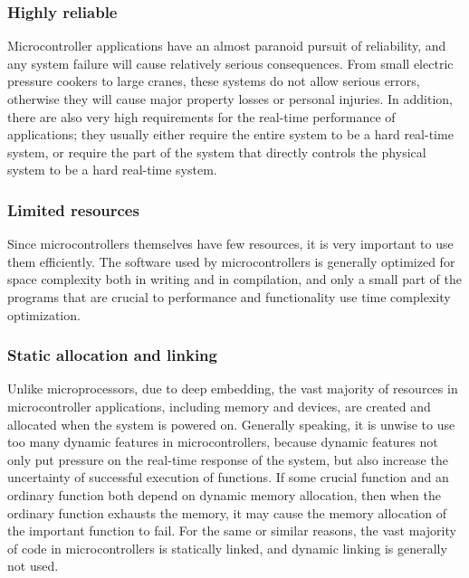\subsubsection{Highly reliable}\label{subsubsec:1-1-1-2}

Microcontroller applications have an almost paranoid pursuit of reliability, and any system failure will cause relatively serious consequences. From small electric pressure cookers to large cranes, these systems do not allow serious errors, otherwise they will cause major property losses or personal injuries. In addition, there are also very high requirements for the real-time performance of applications; they usually either require the entire system to be a hard real-time system, or require the part of the system that directly controls the physical system to be a hard real-time system.

\subsubsection{Limited resources}\label{subsubsec:1-1-1-3}

Since microcontrollers themselves have few resources, it is very important to use them efficiently. The software used by microcontrollers is generally optimized for space complexity both in writing and in compilation, and only a small part of the programs that are crucial to performance and functionality use time complexity optimization.

\subsubsection{Static allocation and linking}\label{subsubsec:1-1-1-4}

Unlike microprocessors, due to deep embedding, the vast majority of resources in microcontroller applications, including memory and devices, are created and allocated when the system is powered on. Generally speaking, it is unwise to use too many dynamic features in microcontrollers, because dynamic features not only put pressure on the real-time response of the system, but also increase the uncertainty of successful execution of functions. If some crucial function and an ordinary function both depend on dynamic memory allocation, then when the ordinary function exhausts the memory, it may cause the memory allocation of the important function to fail. For the same or similar reasons, the vast majority of code in microcontrollers is statically linked, and dynamic linking is generally not used.

